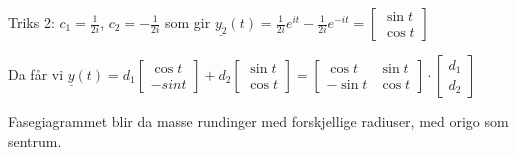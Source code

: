 \documentclass[11pt, a4paper, norsk]{article}
\begin{document}
\begin{Example}{}{}
               Triks 2: $c_1 = \frac{1}{2i}$, $c_2 = -\frac{1}{2i}$ som gir $\underline{y_2}(t) = \frac{1}{2i} e^{it} - \frac{1}{2i}e^{-it} = \begin{bmatrix}
                   \sin{t} \\
                   \cos{t}
               \end{bmatrix}$

               Da får vi $\underline{y}(t) = d_1\begin{bmatrix}
                   \cos{t} \\
                   -sin{t}
               \end{bmatrix} + d_2 \begin{bmatrix}
               \sin{t} \\
               \cos{t}
               \end{bmatrix} = \begin{bmatrix}
               \cos{t} & \sin{t} \\
                -\sin{t} & \cos{t}
               \end{bmatrix} \cdot \begin{bmatrix}
                   d_1 \\
                   d_2
               \end{bmatrix}$

               Fasegiagrammet blir da masse rundinger med forskjellige radiuser, med origo som sentrum.
            \end{Example}
            
\end{document}
